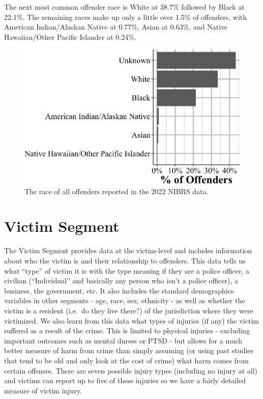\documentclass[
  12pt,
  openany]{book}
\begin{document}
The next most common offender race is White at 38.7\% followed by Black at 22.1\%. The remaining races make up only a little over 1.5\% of offenders, with American Indian/Alaskan Native at 0.77\%, Asian at 0.63\%, and Native Hawaiian/Other Pacific Islander at 0.24\%.

\begin{figure}

{\centering \includegraphics[width=0.9\linewidth]{14_nibrs_offender_files/figure-latex/offenderRace-1} 

}

\caption{The race of all offenders reported in the 2022 NIBRS data.}\label{fig:offenderRace}
\end{figure}

\chapter{Victim Segment}\label{victim-segment-1}

The Victim Segment provides data at the victim-level and includes information about who the victim is and their relationship to offenders. This data tells us what ``type'' of victim it is with the type meaning if they are a police officer, a civilian (``Individual'' and basically any person who isn't a police officer), a business, the government, etc. It also includes the standard demographics variables in other segments - age, race, sex, ethnicity - as well as whether the victim is a resident (i.e.~do they live there?) of the jurisdiction where they were victimized. We also learn from this data what types of injuries (if any) the victim suffered as a result of the crime. This is limited to physical injuries - excluding important outcomes such as mental duress or PTSD - but allows for a much better measure of harm from crime than simply assuming (or using past studies that tend to be old and only look at the cost of crime) what harm comes from certain offenses. There are seven possible injury types (including no injury at all) and victims can report up to five of these injuries so we have a fairly detailed measure of victim injury.
\end{document}
